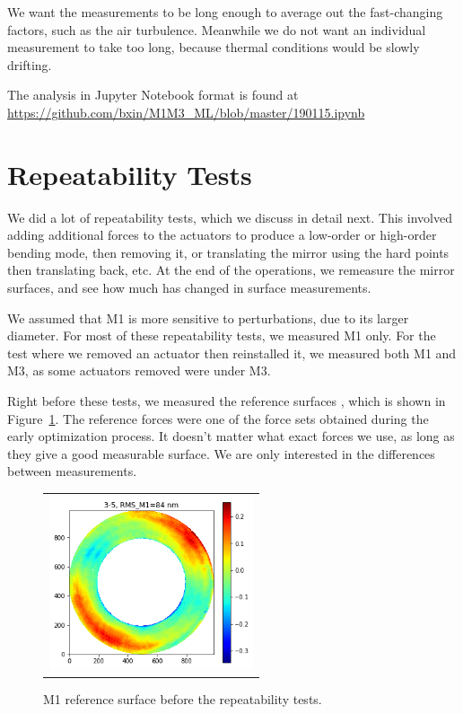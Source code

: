 \documentclass [twoside,openbib,12pt]{article}
\begin{document}
We want the measurements to be long enough to average out the
fast-changing factors, such as the air turbulence. Meanwhile we do not
want an individual measurement to take too long, because thermal
conditions would be slowly drifting.


The analysis in Jupyter Notebook format is found at
\url{https://github.com/bxin/M1M3_ML/blob/master/190115.ipynb}

\section{Repeatability Tests}

We did a lot of repeatability tests, which we discuss in detail
next. This involved adding additional forces to the actuators to
produce a low-order or high-order bending mode, then removing it, or
translating the mirror using the hard points then translating back, etc.
At the end of the operations, we remeasure the mirror surfaces, and see
how much has changed in surface measurements.

We assumed that M1 is more sensitive to perturbations, due to its
larger diameter.
For most of these repeatability tests,
we measured M1 only. For the test where we removed an actuator then
reinstalled it, we measured both M1 and M3, as some actuators removed were
under M3.

Right before these tests, we measured the reference surfaces , which is shown in
Figure~\ref{fig:repeatRef}.
The reference forces were one of the force sets obtained during the
early optimization process.
It doesn't matter what exact forces we use, as long as they give a
good measurable surface. We are only interested in the differences
between measurements.

 \begin{figure}[bthp]
   \begin{center}
   \begin{tabular}{c}
\includegraphics[width=60mm]{figures/repeatRef.png}
  \end{tabular}
   \end{center}
   \caption
  { \label{fig:repeatRef}
M1 reference surface before the repeatability tests.
 }
\end{figure}
\end{document}
